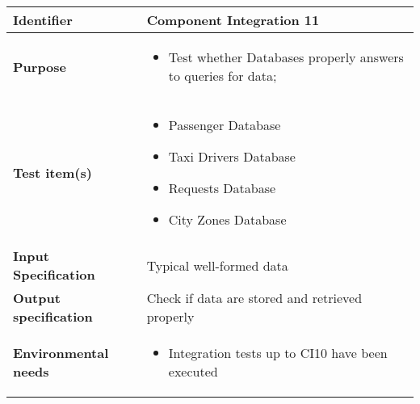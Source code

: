 \begin{center}
\begin{tabular}{lp{}}
\toprule
\textbf{Identifier}		&	Component Integration 11\\
\midrule
\textbf{Purpose}		&	\begin{itemize}
					\item Test whether Databases properly answers to queries for data;
					\end{itemize}	\\
\textbf{Test item(s)}	&	\begin{itemize}
					\item Passenger Database
					\item Taxi Drivers Database
					\item Requests Database
					\item City Zones Database
					\end{itemize}	\\
\textbf{Input Specification}	&	Typical well-formed data\\
\textbf{Output specification}	&	Check if data are stored and retrieved properly\\
\textbf{Environmental needs}	&	\begin{itemize}
							\item Integration tests up to CI10 have been executed
							\end{itemize}	\\
\bottomrule
\end{tabular}
\end{center}

